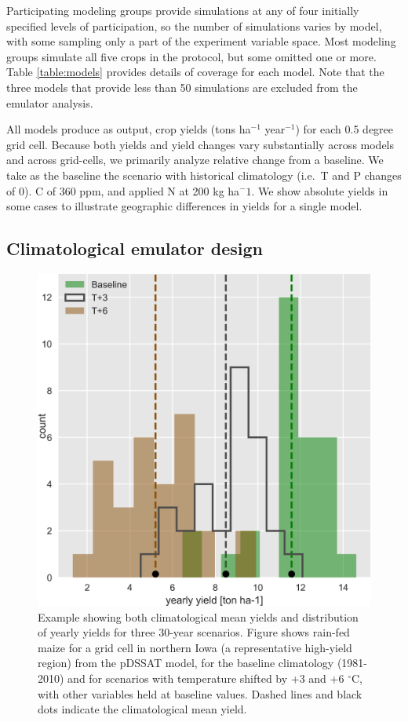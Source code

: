 \documentclass[preprint, 5p, times, twocolumn]{elsarticle}
\begin{document}
Participating modeling groups provide simulations at any of four initially specified levels of participation, so the number of simulations varies by model, with some sampling only a part of the experiment variable space. Most modeling groups simulate all five crops in the protocol, but some omitted one or more. Table \ref{table:models} provides details of coverage for each model. Note that the three models that provide less than 50 simulations are excluded from the emulator analysis. 

All models produce as output, crop yields (tons ha$^{-1}$ year$^{-1}$) for each 0.5 degree grid cell. Because both yields and yield changes vary substantially across models and across grid-cells, we primarily analyze relative change from a baseline. We take as the baseline the scenario with historical climatology (i.e.\ T and P changes of 0). C of 360 ppm, and applied N at 200 kg ha$^-1$.  We show absolute yields in some cases to illustrate geographic differences in yields for a single model. 

\subsection{Climatological emulator design}
\begin{figure}[!h]
\centering
   \includegraphics[width=0.95\linewidth]{hist_year.png}
   \caption{Example showing both climatological mean yields and distribution of yearly yields for three 30-year scenarios. Figure shows rain-fed maize for a grid cell in northern Iowa (a representative high-yield region) from the pDSSAT model, for the baseline climatology (1981-2010) and for scenarios with temperature shifted by +3 and +6 $^{\circ}$C, with other variables held at baseline values. Dashed lines and black dots indicate the climatological mean yield.}
   \label{fig:yearly}
\end{figure}
\end{document}
